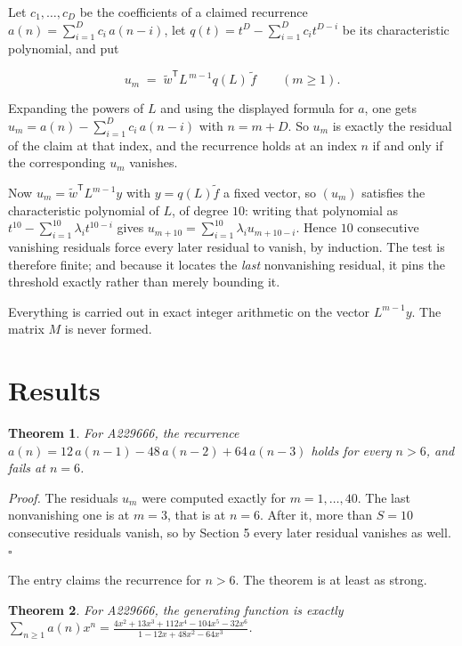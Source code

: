 \documentclass[11pt]{article}
\newtheorem{theorem}{Theorem}
\theoremstyle{definition}
\begin{document}
Let $c_1,\dots,c_D$ be the coefficients of a claimed recurrence $a(n) = \sum_{i=1}^{D} c_i\,a(n-i)$, let $q(t) = t^{D} - \sum_{i=1}^{D} c_i t^{D-i}$ be its characteristic polynomial, and put

\[u_m \;=\; \tilde w^{\mathsf T} L^{\,m-1} q(L)\,\tilde f \qquad (m \ge 1).\]

Expanding the powers of $L$ and using the displayed formula for $a$, one gets $u_m = a(n) - \sum_{i=1}^{D} c_i\,a(n-i)$ with $n = m + D$. So $u_m$ is exactly the residual of the claim at that index, and the recurrence holds at an index $n$ if and only if the corresponding $u_m$ vanishes.

Now $u_m = \tilde w^{\mathsf T} L^{m-1} y$ with $y = q(L)\tilde f$ a fixed vector, so $(u_m)$ satisfies the characteristic polynomial of $L$, of degree $10$: writing that polynomial as $t^{10} - \sum_{i=1}^{10} \lambda_i t^{10-i}$ gives $u_{m+10} = \sum_{i=1}^{10} \lambda_i u_{m+10-i}$. Hence $10$ consecutive vanishing residuals force every later residual to vanish, by induction. The test is therefore finite; and because it locates the {\itshape last} nonvanishing residual, it pins the threshold exactly rather than merely bounding it.

Everything is carried out in exact integer arithmetic on the vector $L^{m-1}y$. The matrix $M$ is never formed.

\section{Results}

\begin{theorem} For A229666, the recurrence $a(n) = 12\,a(n-1) - 48\,a(n-2) + 64\,a(n-3)$ holds for every $n > 6$, and fails at $n = 6$.\end{theorem}

{\itshape Proof.} The residuals $u_m$ were computed exactly for $m = 1,\dots,40$. The last nonvanishing one is at $m = 3$, that is at $n = 6$. After it, more than $S = 10$ consecutive residuals vanish, so by Section 5 every later residual vanishes as well. $\square$

The entry claims the recurrence for $n > 6$. The theorem is at least as strong.

\begin{theorem} For A229666, the generating function is exactly $\sum_{n\ge 1} a(n)x^n = \frac{4x^{2} + 13x^{3} + 112x^{4} - 104x^{5} - 32x^{6}}{1 - 12x + 48x^{2} - 64x^{3}}$.\end{theorem}
\end{document}
